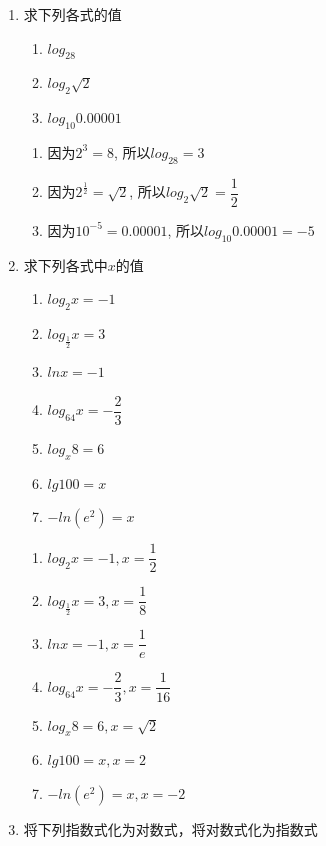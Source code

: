 \begin{enumerate}
    \item 求下列各式的值
    \begin{enumerate}
        \item $log_28$
        \item $log_2\sqrt{2}$
        \item $log_{10}0.00001$
    \end{enumerate}
    \begin{jieda}
        \begin{enumerate}
            \item 因为$2^3 = 8$, 所以$log_28=3$
            \item 因为$2^{\frac{1}{2}} = \sqrt{2}$, 所以$log_2\sqrt{2} = \dfrac{1}{2}$
            \item 因为$10^{-5} = 0.00001$, 所以$log_{10}0.00001 = -5$
        \end{enumerate}
    \end{jieda}
    \item 求下列各式中$x$的值
    \begin{enumerate}
        \item $log_2x = -1$
        \item $log_{\frac{1}{2}}x = 3$
        \item $lnx = -1$
        \item $log_{64}x = -\dfrac{2}{3}$
        \item $log_x8 = 6$
        \item $lg100 = x$
        \item $-ln(e^2) = x$
    \end{enumerate}
    \begin{jieda}
        \begin{enumerate}
            \item $log_2x = -1, x = \dfrac{1}{2}$
            \item $log_{\frac{1}{2}}x = 3, x = \dfrac{1}{8}$
            \item $lnx = -1, x = \dfrac{1}{e}$
            \item $log_{64}x = -\dfrac{2}{3}, x = \dfrac{1}{16}$
            \item $log_x8 = 6, x = \sqrt{2}$
            \item $lg100 = x, x = 2$
            \item $-ln(e^2) = x, x = -2$
        \end{enumerate}
    \end{jieda}
    \item 将下列指数式化为对数式，将对数式化为指数式

\end{enumerate}
